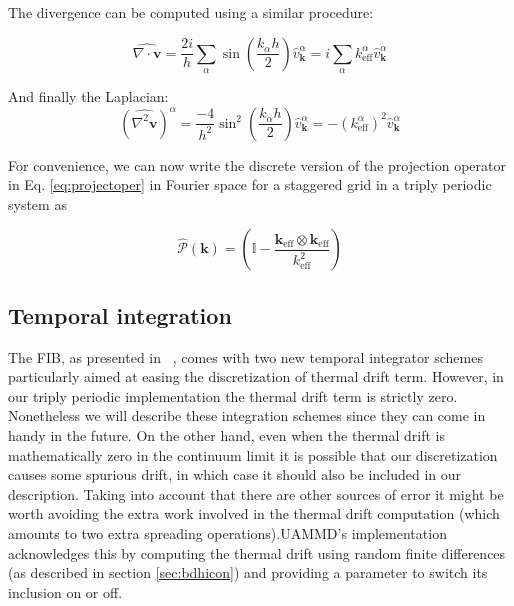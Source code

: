 \documentclass[twoside,openright,titlepage,numbers=noenddot,%
headinclude,footinclude,cleardoublepage=empty,abstract=on,
BCOR=5mm,fontsize=11pt, dvipsnames, paper=b5
]{scrreprt}
\renewcommand{\vec}[1]{\bm{#1}}
\newcommand{\oper}[1]{\mathcal{#1}}
\newcommand{\uammd}{\gls{UAMMD}\xspace}
\newcommand{\fou}[1]{\widehat{#1}}
\begin{document}
The divergence can be computed using a similar procedure:

\begin{equation}
  \label{eq:staggereddivfou}
  \fou{\nabla\cdot\vec{v}} = \frac{2i}{h}\sum_\alpha\sin\left(\frac{k_\alpha h}{2}\right)\fou{v}_{\vec{k}}^\alpha = i \sum_\alpha k^\alpha_{\text{eff}}\fou{v}_{\vec{k}}^\alpha
\end{equation}

And finally the Laplacian:
\begin{equation}
  \label{eq:staggeredlapfou}
  \left(\fou{\nabla^2\vec{v}}\right)^ \alpha = \frac{-4}{h^2}\sin^2\left(\frac{k_\alpha h}{2}\right)\fou{v}_{\vec{k}}^\alpha = - \left(k^\alpha_{\text{eff}}\right)^2\fou{v}_{\vec{k}}^\alpha
\end{equation}

For convenience, we can now write the discrete version of the projection operator in Eq. \eqref{eq:projectoper} in Fourier space for a staggered grid in a triply periodic system as

\begin{equation}
  \label{eq:staggeredprojection}
  \fou{\oper{P}}(\vec{k}) = \left(\mathbb{I} - \frac{\vec{k}_{\text{eff}}\otimes\vec{k}_{\text{eff}}}{k_{\text{eff}}^2}\right)
\end{equation}
\subsection*{Temporal integration}
The \gls{FIB}, as presented in ~\cite{Delong2014}, comes with two new temporal integrator schemes particularly aimed at easing the discretization of thermal drift term. However, in our triply periodic implementation the thermal drift term is strictly zero. Nonetheless we will describe these integration schemes since they can come in handy in the future. On the other hand, even when the thermal drift is mathematically zero in the continuum limit it is possible that our discretization causes some spurious drift, in which case it should also be included in our description.
Taking into account that there are other sources of error it might be worth avoiding the extra work involved in the thermal drift computation (which amounts to two extra spreading operations).\uammd's implementation acknowledges this by computing the thermal drift using random finite differences (as described in section \ref{sec:bdhicon}) and providing a parameter to switch its inclusion on or off.
\end{document}
